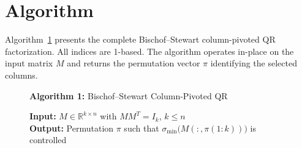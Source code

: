 \documentclass[11pt]{article}
\theoremstyle{definition}
\theoremstyle{remark}
\newcommand{\R}{\mathbb{R}}
\newcommand{\smin}{\sigma_{\min}}
\begin{document}
\section{Algorithm}
\label{sec:algorithm}

Algorithm~\ref{alg:bs-qr} presents the complete Bischof--Stewart
column-pivoted QR factorization.  All indices are 1-based.  The
algorithm operates in-place on the input matrix $M$ and returns the
permutation vector $\pi$ identifying the selected columns.

\begin{figure}[ht]
\begin{mdframed}
\textbf{Algorithm 1:} Bischof--Stewart Column-Pivoted QR
\label{alg:bs-qr}

\medskip\noindent
\textbf{Input:} $M \in \R^{k \times n}$ with $MM^T = I_k$, \; $k \leq n$\\
\textbf{Output:} Permutation $\pi$ such that
  $\smin\!\bigl(M(:,\pi(1{:}k))\bigr)$ is controlled


\end{mdframed}
\end{figure}
\end{document}
